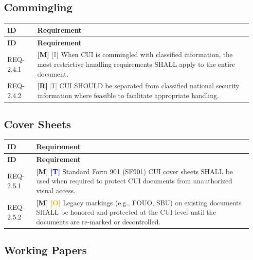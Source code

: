 \documentclass[11pt,letterpaper]{article}
\begin{document}
\subsection{Commingling}

\begin{longtable}{@{}p{1.4cm}p{11.6cm}@{}}
\toprule
\textbf{ID} & \textbf{Requirement} \\
\midrule
\endfirsthead
\toprule
\textbf{ID} & \textbf{Requirement} \\
\midrule
\endhead

REQ-2.4.1 & \textcolor{mandatory}{\textbf{[M]}} \textcolor{gray}{\textbf{[I]}} When CUI is commingled with classified information, the most restrictive handling requirements SHALL apply to the entire document. \\[6pt]

REQ-2.4.2 & \textcolor{recommended}{\textbf{[R]}} \textcolor{gray}{\textbf{[I]}} CUI SHOULD be separated from classified national security information where feasible to facilitate appropriate handling. \\[6pt]

\bottomrule
\end{longtable}

\subsection{Cover Sheets}

\begin{longtable}{@{}p{1.4cm}p{11.6cm}@{}}
\toprule
\textbf{ID} & \textbf{Requirement} \\
\midrule
\endfirsthead
\toprule
\textbf{ID} & \textbf{Requirement} \\
\midrule
\endhead

REQ-2.5.1 & \textcolor{mandatory}{\textbf{[M]}} \textcolor{blue}{\textbf{[T]}} Standard Form 901 (SF901) CUI cover sheets SHALL be used when required to protect CUI documents from unauthorized visual access. \\[6pt]

REQ-2.5.2 & \textcolor{mandatory}{\textbf{[M]}} \textcolor{orange}{\textbf{[O]}} Legacy markings (e.g., FOUO, SBU) on existing documents SHALL be honored and protected at the CUI level until the documents are re-marked or decontrolled. \\[6pt]

\bottomrule
\end{longtable}

\subsection{Working Papers}
\end{document}
